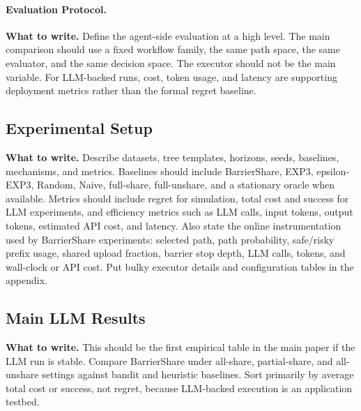 \documentclass{article}
\newcommand{\towrite}[1]{\noindent\textbf{What to write.} #1}
\begin{document}
\paragraph{Evaluation Protocol.}
\towrite{Define the agent-side evaluation at a high level. The main comparison should use a fixed workflow family, the same path space, the same evaluator, and the same decision space. The executor should not be the main variable. For LLM-backed runs, cost, token usage, and latency are supporting deployment metrics rather than the formal regret baseline.}

\subsection{Experimental Setup}

\towrite{Describe datasets, tree templates, horizons, seeds, baselines, mechanisms, and metrics. Baselines should include BarrierShare, EXP3, epsilon-EXP3, Random, Naive, full-share, full-unshare, and a stationary oracle when available. Metrics should include regret for simulation, total cost and success for LLM experiments, and efficiency metrics such as LLM calls, input tokens, output tokens, estimated API cost, and latency. Also state the online instrumentation used by BarrierShare experiments: selected path, path probability, safe/risky prefix usage, shared upload fraction, barrier stop depth, LLM calls, tokens, and wall-clock or API cost. Put bulky executor details and configuration tables in the appendix.}

\subsection{Main LLM Results}

\towrite{This should be the first empirical table in the main paper if the LLM run is stable. Compare BarrierShare under all-share, partial-share, and all-unshare settings against bandit and heuristic baselines. Sort primarily by average total cost or success, not regret, because LLM-backed execution is an application testbed.}
\end{document}
